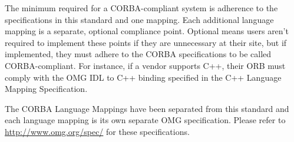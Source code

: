 The minimum required for a CORBA-compliant system is adherence to the
specifications in this standard and one mapping. Each additional
language mapping is a separate, optional compliance point. Optional
means users aren't required to implement these points if they are
unnecessary at their site, but if implemented, they must adhere to the
CORBA specifications to be called CORBA-compliant. For instance, if a
vendor supports C++, their ORB must comply with the OMG IDL to C++
binding specified in the C++ Language Mapping Specification.

The CORBA Language Mappings have been separated from this standard and
each language mapping is its own separate OMG specification. Please
refer to \url{http://www.omg.org/spec/} for these specifications.

